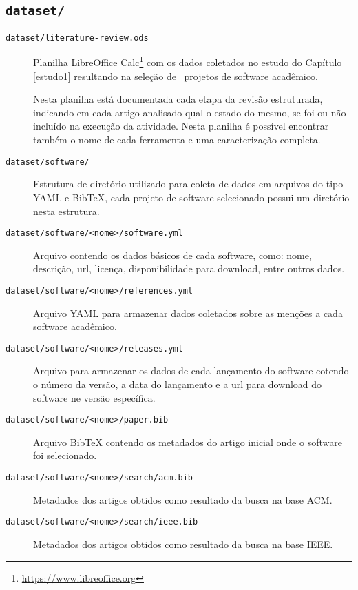 \subsection{\texttt{dataset/}}


\begin{description}

  \item [\texttt{dataset/literature-review.ods}]
    Planilha LibreOffice Calc\footnote{\url{https://www.libreoffice.org}} com
    os dados coletados no estudo do Capítulo \ref{estudo1} resultando na
    seleção de \SoftwareCount \ projetos de software acadêmico.

Nesta planilha está documentada cada etapa da revisão estruturada, indicando em
cada artigo analisado qual o estado do mesmo, se foi ou não incluído na
execução da atividade.  Nesta planilha é possível encontrar também o nome de
cada ferramenta e uma caracterização completa.

  \item [\texttt{dataset/software/}]
    Estrutura de diretório utilizado para coleta de dados em arquivos do tipo
    YAML e BibTeX, cada projeto de software selecionado possui um diretório
    nesta estrutura.

  \item [\texttt{dataset/software/<nome>/software.yml}]
    Arquivo contendo os dados básicos de cada software, como: nome, descrição, url,
    licença, disponibilidade para download, entre outros dados.

  \item [\texttt{dataset/software/<nome>/references.yml}]
    Arquivo YAML para armazenar dados coletados sobre as menções a cada software
    acadêmico.

  \item [\texttt{dataset/software/<nome>/releases.yml}]
    Arquivo para armazenar os dados de cada lançamento do software cotendo o
    número da versão, a data do lançamento e a url para download do software
    ne versão específica.

  \item [\texttt{dataset/software/<nome>/paper.bib}]
    Arquivo BibTeX contendo os metadados do artigo inicial onde o software foi
    selecionado.

  \item [\texttt{dataset/software/<nome>/search/acm.bib}]
    Metadados dos artigos obtidos como resultado da busca na base ACM.

  \item [\texttt{dataset/software/<nome>/search/ieee.bib}]
    Metadados dos artigos obtidos como resultado da busca na base IEEE.

\end{description}

